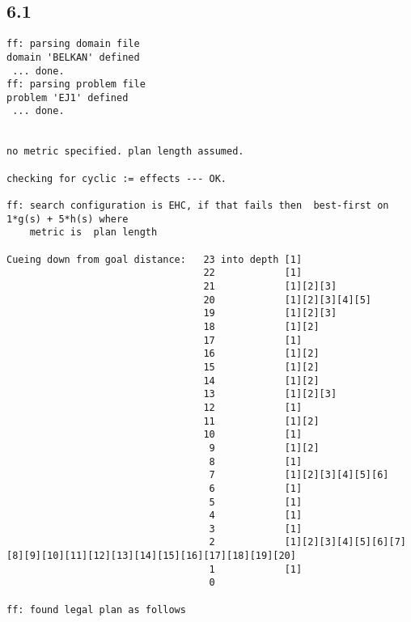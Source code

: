 \documentclass{article}
\begin{document}
\subsection*{6.1}
\begin{lstlisting}
ff: parsing domain file
domain 'BELKAN' defined
 ... done.
ff: parsing problem file
problem 'EJ1' defined
 ... done.


no metric specified. plan length assumed.

checking for cyclic := effects --- OK.

ff: search configuration is EHC, if that fails then  best-first on 1*g(s) + 5*h(s) where
    metric is  plan length

Cueing down from goal distance:   23 into depth [1]
                                  22            [1]
                                  21            [1][2][3]
                                  20            [1][2][3][4][5]
                                  19            [1][2][3]
                                  18            [1][2]
                                  17            [1]
                                  16            [1][2]
                                  15            [1][2]
                                  14            [1][2]
                                  13            [1][2][3]
                                  12            [1]
                                  11            [1][2]
                                  10            [1]
                                   9            [1][2]
                                   8            [1]
                                   7            [1][2][3][4][5][6]
                                   6            [1]
                                   5            [1]
                                   4            [1]
                                   3            [1]
                                   2            [1][2][3][4][5][6][7][8][9][10][11][12][13][14][15][16][17][18][19][20]
                                   1            [1]
                                   0

ff: found legal plan as follows


\end{lstlisting}
\end{document}
